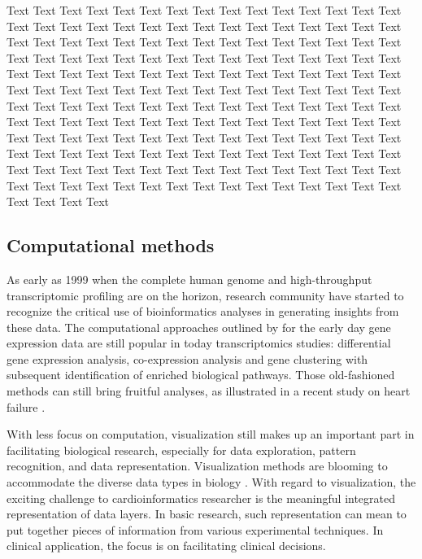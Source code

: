 \documentclass[letter]{bioinfo}
\begin{document}
Text Text Text Text Text Text  Text Text Text Text Text Text Text Text  Text Text Text Text Text Text Text Text  Text Text Text Text Text Text Text Text  Text Text Text Text Text Text Text Text  Text Text Text Text Text Text Text Text  Text Text Text Text Text Text Text Text  Text Text Text Text Text Text Text Text  Text Text Text Text Text Text Text Text  Text Text Text Text Text Text Text Text  Text Text Text Text Text Text Text Text  Text Text Text Text Text Text Text Text  Text Text Text Text Text Text Text Text  Text Text Text Text Text Text Text Text  Text Text Text Text Text Text Text Text  Text Text Text Text Text Text Text Text  Text Text Text Text Text Text Text Text  Text Text Text Text Text Text Text Text  Text Text Text Text Text Text Text Text  Text Text Text Text Text Text Text Text  Text Text Text Text Text Text Text Text  Text Text Text Text Text Text Text Text  Text Text Text Text Text Text Text Text  Text Text 

%
%
%
%

\subsection{Computational methods}

As early as 1999 when the complete human genome and high-throughput transcriptomic profiling are on the horizon, research community have started to recognize the critical use of bioinformatics analyses in generating insights from these data. The computational approaches outlined by \cite{Claverie:1999:Computational} for the early day gene expression data are still popular in today transcriptomics studies: differential gene expression analysis, co-expression analysis and gene clustering with subsequent identification of enriched biological pathways. Those old-fashioned methods can still bring fruitful analyses, as illustrated in a recent study on heart failure \citep{Santolini:2018:personalized}.


With less focus on computation, visualization still makes up an important part in facilitating biological research, especially for data exploration, pattern recognition, and data representation. Visualization methods are blooming to accommodate the diverse data types in biology \citep{Pavlopoulos:2015:Visualizing}. With regard to visualization, the exciting challenge to cardioinformatics researcher is the meaningful integrated representation of data layers. In basic research, such representation can mean to put together pieces of information from various experimental techniques. In clinical application, the focus is on facilitating clinical decisions.
\end{document}
